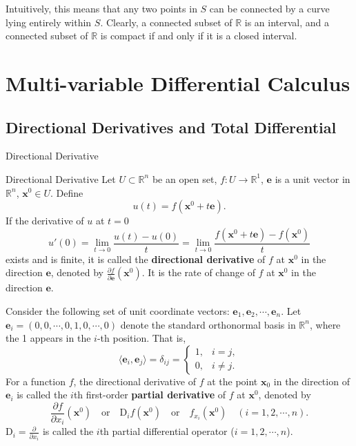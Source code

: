 \documentclass[11pt]{elegantbook}
\begin{document}
\begin{remark}
    Intuitively, this means that any two points in \(S\) can be connected 
    by a curve lying entirely within \(S\). 
    Clearly, a connected subset of \(\mathbb{R}\) is an interval, 
    and a connected subset of \(\mathbb{R}\) is compact if and only if it is a closed interval.
\end{remark}



\chapter{Multi-variable Differential Calculus}
\section{Directional Derivatives and Total Differential}
\begin{leftbarTitle}{Directional Derivative}\end{leftbarTitle}
\begin{definition}{Directional Derivative}
    Let \(U\subset \mathbb{R}^n\) be an open set, \(f: U\to \mathbb{R}^{1}\),
    \(\mathbf{e}\) is a unit vector in \(\mathbb{R}^{n}\), \(\mathbf{x}^{0}\in U\). Define
    \[
    u(t) = f(\mathbf{x}^{0} + t\mathbf{e}).
    \]
    If the derivative of \(u\) at \(t=0\) 
    \[ 
        u'(0) = \lim_{t \to 0} \frac{u(t) - u(0)}{t} = 
        \lim_{t \to 0} \frac{f(\mathbf{x}^{0} + t\mathbf{e}) - f(\mathbf{x}^{0})}{t} 
    \] 
    exists and is finite, 
    it is called the \textbf{directional derivative} of \(f\) at \(\mathbf{x}^{0}\) in the direction \(\mathbf{e}\), 
    denoted by \(\frac{\partial f}{\partial \mathbf{e}}(\mathbf{x}^{0})\). 
    It is the rate of change of \(f\) at \(\mathbf{x}^{0}\) in the direction \(\mathbf{e}\).
\end{definition}

Consider the following set of unit coordinate vectors: \(\mathbf{e}_{1},\mathbf{e}_{2},\cdots,\mathbf{e}_{n}\).
Let \(\mathbf{e}_{i}=\left( 0, 0, \cdots, 0, 1, 0, \cdots, 0 \right)  \) denote the standard orthonormal basis 
in \(\mathbb{R}^{n}\), where the 1 appears in the \(i\)-th position. That is,
\[
    \langle \mathbf{e}_{i}, \mathbf{e}_{j} \rangle = \delta_{i j} = \begin{cases}
    1, & i = j, \\
    0, & i \neq j.
    \end{cases}
\]
For a function \( f \), the directional derivative of \( f \) at the point \( \mathbf{x}_{0} \) 
in the direction of \( \mathbf{e}_{i} \) 
is called the \( i \)th first-order \textbf{partial derivative} of \( f \) at \(\mathbf{x}^{0}\), denoted by
\[
\frac{\partial f}{\partial x_i}(\mathbf{x}^{0}) \quad \text{or} 
\quad \mathrm{D}_i f(\mathbf{x}^{0})  \quad \text{or} 
\quad f_{x_i}(\mathbf{x}^{0}) \quad (i = 1, 2, \cdots, n).
\]
\( \mathrm{D}_i = \frac{\partial}{\partial x_i} \) is called the \( i \)th partial differential operator (\( i = 1, 2, \cdots, n \)).
\end{document}
